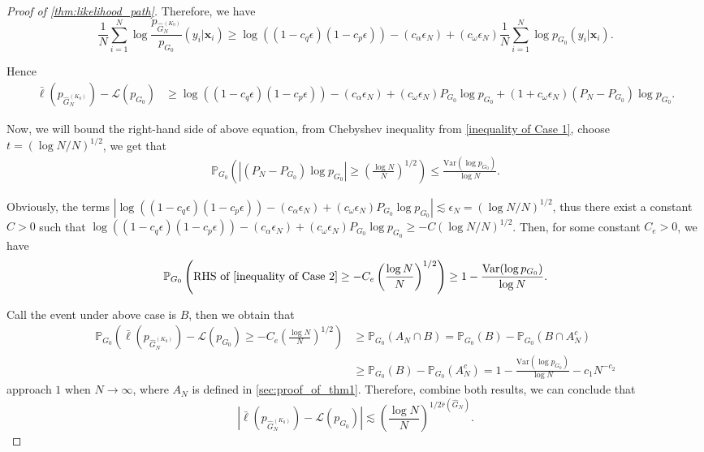 \documentclass[twoside]{article}
\theoremstyle{plain}
\theoremstyle{definition}
\theoremstyle{plain}
\def\vx{{\bm{x}}}
\newcommand{\Var}{\mathrm{Var}}
\newcommand{\cL}{\mathcal{L}}
\begin{document}
\begin{proof}[Proof of \cref{thm:likelihood_path}]
    Therefore, we have $$\frac{1}{N} \sum_{i = 1}^N \log \frac{p_{\widehat{G}^{(K_0)}_N}}{p_{G_0}} (y_i | \vx_i) \geq \log ((1 - c_q \epsilon) (1 - c_p \epsilon)) - (c_{\alpha} \epsilon_N) + (c_{\omega} \epsilon_N) \frac{1}{N} \sum_{i = 1}^N \log p_{G_0} (y_i | \vx_i).$$

    Hence
    \begin{align}
        \bar{\ell} (p_{\widehat{G}^{(K_0)}_N}) - \cL (p_{G_0}) &\geq \log ((1 - c_q \epsilon) (1 - c_p \epsilon)) - (c_{\alpha} \epsilon_N) + (c_{\omega} \epsilon_N) P_{G_0} \log p_{G_0} + (1 + c_{\omega} \epsilon_N) (P_N - P_{G_0}) \log p_{G_0}. \label{inequality of Case 2}
    \end{align}

    Now, we will bound the right-hand side of above equation, from Chebyshev inequality from \cref{inequality of Case 1}, choose $t = (\log N/N)^{1/2}$, we get that 
    \begin{align}
        \mathbb{P}_{G_0} \left(|(P_N - P_{G_0}) \log{p_{G_0}}| \geq \left( \frac{\log N}{N} \right)^{1/2}\right) \leq \frac{\Var (\log p_{G_0})}{\log N}. \nonumber
    \end{align}

    Obviously, the terms $|\log ((1 - c_q \epsilon) (1 - c_p \epsilon)) - (c_{\alpha} \epsilon_N) + (c_{\omega} \epsilon_N) P_{G_0} \log p_{G_0}| \lesssim \epsilon_N = (\log N/N)^{1/2}$, thus there exist a constant $C > 0$ such that $\log ((1 - c_q \epsilon) (1 - c_p \epsilon)) - (c_{\alpha} \epsilon_N) + (c_{\omega} \epsilon_N) P_{G_0} \log p_{G_0} \geq -C(\log N/N)^{1/2}$. Then, for some constant $C_e > 0$, we have $$\mathbb{P}_{G_0} \left( \text{RHS of \cref{inequality of Case 2}} \geq - C_e \left( \frac{\log N}{N} \right)^{1/2}  \right) \geq 1 - \frac{\Var (\log p_{G_0})}{\log N}.$$

    Call the event under above case is $B$, then we obtain that 
    \begin{align*}
        \mathbb{P}_{G_0} \left( \bar{\ell} (p_{\widehat{G}^{(K_0)}_N}) - \cL (p_{G_0}) \geq - C_e \left( \frac{\log N}{N} \right)^{1/2}  \right) &\geq \mathbb{P}_{G_0} (A_N \cap B)  = \mathbb{P}_{G_0} (B) - \mathbb{P}_{G_0} (B \cap A_N^c) \\
        &\geq \mathbb{P}_{G_0} (B) - \mathbb{P}_{G_0} (A_N^c) = 1 - \frac{\Var (\log p_{G_0})}{\log N} - c_1 N^{-c_2}
    \end{align*}
    approach $1$ when $N \to \infty$, where $A_N$ is defined in \cref{sec:proof_of_thm1}. Therefore, combine both results, we can conclude that $$|\bar{\ell} (p_{\widehat{G}^{(K_0)}_N}) - \cL (p_{G_0})| \lesssim \left( \dfrac{\log N}{N} \right)^{1/2 \bar{r}(\widehat{G}_N)}.$$


\end{proof}
\end{document}
